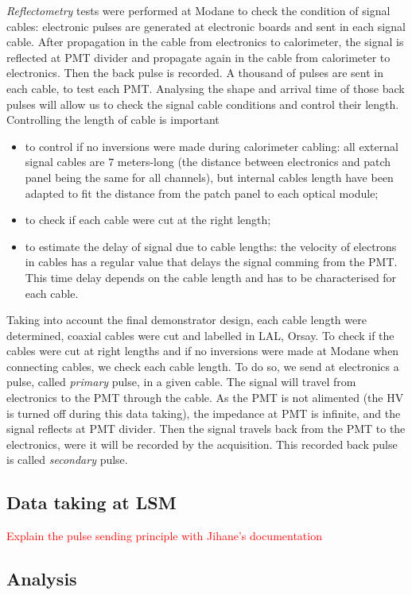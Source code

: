 \emph{Reflectometry} tests were performed at Modane to check the condition of signal cables:
electronic pulses are generated at electronic boards and sent in each signal cable.
After propagation in the cable from electronics to calorimeter, the signal is reflected at PMT divider and propagate again in the cable from calorimeter to electronics.
Then the back pulse is recorded.
A thousand of pulses are sent in each cable, to test each PMT.
Analysing the shape and arrival time of those back pulses will allow us to check the signal cable conditions and control their length.
Controlling the length of cable is important
\begin{itemize}
\item to control if no inversions were made during calorimeter cabling: all external signal cables are $7$ meters-long (the distance between electronics and patch panel being the same for all channels), but internal cables length have been adapted to fit the distance from the patch panel to each optical module;
\item to check if each cable were cut at the right length;
\item to estimate the delay of signal due to cable lengths: the velocity of electrons in cables has a regular value that delays the signal comming from the PMT. This time delay depends on the cable length and has to be characterised for each cable.
\end{itemize}

Taking into account the final demonstrator design, each cable length were determined, coaxial cables were cut and labelled in LAL, Orsay.
To check if the cables were cut at right lengths and if no inversions were made at Modane when connecting cables, we check each cable length.
To do so, we send at electronics a pulse, called \emph{primary} pulse, in a given cable.
The signal will travel from electronics to the PMT through the cable.
As the PMT is not alimented (the HV is turned off during this data taking), the impedance at PMT is infinite, and the signal reflects at PMT divider.
Then the signal travels back from the PMT to the electronics, were it will be recorded by the acquisition.
This recorded back pulse is called \emph{secondary} pulse.


\subsection{Data taking at LSM}
\textcolor{red}{Explain the pulse sending principle with Jihane's documentation}
\subsection{Analysis}

